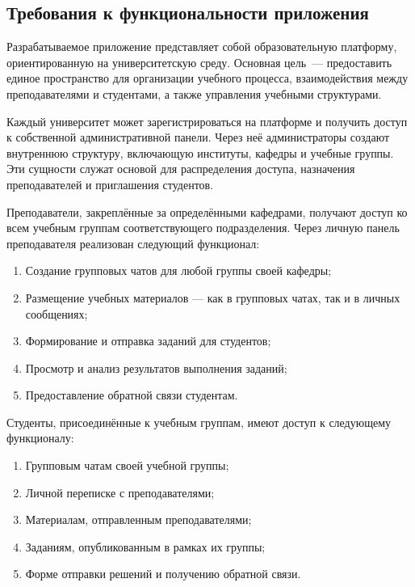 \subsection{Требования к функциональности приложения}

Разрабатываемое приложение представляет собой образовательную платформу, ориентированную на университетскую среду. Основная цель~--- предоставить единое пространство для организации учебного процесса, взаимодействия между преподавателями и студентами, а также управления учебными структурами.

Каждый университет может зарегистрироваться на платформе и получить доступ к собственной административной панели. Через неё администраторы создают внутреннюю структуру, включающую институты, кафедры и учебные группы. Эти сущности служат основой для распределения доступа, назначения преподавателей и приглашения студентов.

Преподаватели, закреплённые за определёнными кафедрами, получают доступ ко всем учебным группам соответствующего подразделения. Через личную панель преподавателя реализован следующий функционал:
\begin{enumerate}
  \item Создание групповых чатов для любой группы своей кафедры;
  \item Размещение учебных материалов — как в групповых чатах, так и в личных сообщениях;
  \item Формирование и отправка заданий для студентов;
  \item Просмотр и анализ результатов выполнения заданий;
  \item Предоставление обратной связи студентам.
\end{enumerate}

Студенты, присоединённые к учебным группам, имеют доступ к следующему функционалу:
\begin{enumerate}
  \item Групповым чатам своей учебной группы;
  \item Личной переписке с преподавателями;
  \item Материалам, отправленным преподавателями;
  \item Заданиям, опубликованным в рамках их группы;
  \item Форме отправки решений и получению обратной связи.
\end{enumerate}
